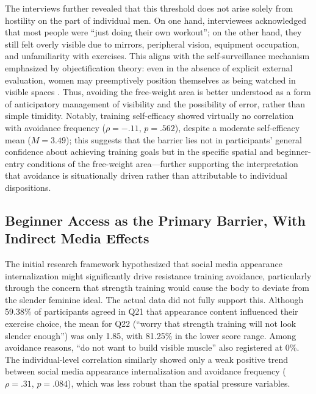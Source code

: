 The interviews further revealed that this threshold does not arise solely from hostility on the part of individual men.
On one hand, interviewees acknowledged that most people were ``just doing their own workout''; on the other hand, they still felt overly visible due to mirrors, peripheral vision, equipment occupation, and unfamiliarity with exercises.
This aligns with the self-surveillance mechanism emphasized by objectification theory: even in the absence of explicit external evaluation, women may preemptively position themselves as being watched in visible spaces \parencite{fredrickson1997objectification,clark2018gaze}.
Thus, avoiding the free-weight area is better understood as a form of anticipatory management of visibility and the possibility of error, rather than simple timidity.
Notably, training self-efficacy showed virtually no correlation with avoidance frequency ($\rho = -.11$, $p = .562$), despite a moderate self-efficacy mean ($M = 3.49$); this suggests that the barrier lies not in participants' general confidence about achieving training goals but in the specific spatial and beginner-entry conditions of the free-weight area---further supporting the interpretation that avoidance is situationally driven rather than attributable to individual dispositions.

\subsection{Beginner Access as the Primary Barrier, With Indirect Media Effects}

The initial research framework hypothesized that social media appearance internalization might significantly drive resistance training avoidance, particularly through the concern that strength training would cause the body to deviate from the slender feminine ideal.
The actual data did not fully support this.
Although 59.38\% of participants agreed in Q21 that appearance content influenced their exercise choice, the mean for Q22 (``worry that strength training will not look slender enough'') was only 1.85, with 81.25\% in the lower score range.
Among avoidance reasons, ``do not want to build visible muscle'' also registered at 0\%.
The individual-level correlation similarly showed only a weak positive trend between social media appearance internalization and avoidance frequency ($\rho = .31$, $p = .084$), which was less robust than the spatial pressure variables.

